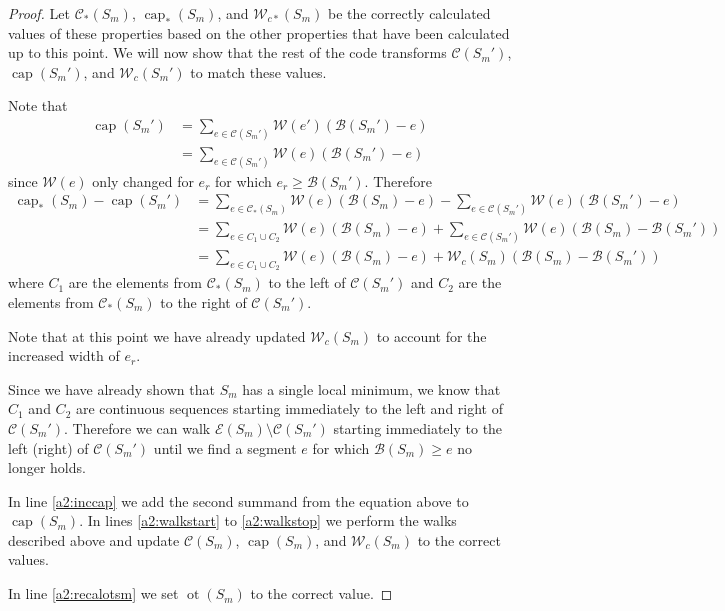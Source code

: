 \documentclass[11pt,a4paper]{article}
\DeclareMathOperator{\capp}{cap}
\DeclareMathOperator{\ot}{ot}
\begin{document}
\begin{proof}
Let $\mathcal{C_*}(S_m)$, $\capp_*(S_m)$, and $\mathcal{W}_{c*}(S_m)$ be the correctly calculated values of these properties based on the other properties that have been calculated up to this point.
We will now show that the rest of the code transforms $\mathcal{C}(S_m')$, $\capp(S_m')$, and $\mathcal{W}_c(S_m')$ to match these values.

Note that
\begin{align*}
    \capp(S_m') &= \sum_{e\in\mathcal{C}(S_m')} \mathcal{W}(e')(\mathcal{B}(S_m')-e) \\
                &= \sum_{e\in\mathcal{C}(S_m')} \mathcal{W}(e)(\mathcal{B}(S_m')-e)
\end{align*}
since $\mathcal{W}(e)$ only changed for $e_r$ for which $e_r\ge\mathcal{B}(S_m')$.
Therefore
\begin{align*}
    \capp_*(S_m) - \capp(S_m') &= \sum_{e\in\mathcal{C_*}(S_m)} \mathcal{W}(e)(\mathcal{B}(S_m)-e) - \sum_{e\in\mathcal{C}(S_m')} \mathcal{W}(e)(\mathcal{B}(S_m')-e) \\
               &= \sum_{e\in C_1\cup C_2}\mathcal{W}(e)(\mathcal{B}(S_m)-e) + \sum_{e\in\mathcal{C}(S_m')} \mathcal{W}(e)(\mathcal{B}(S_m)-\mathcal{B}(S_m')) \\
               &= \sum_{e\in C_1\cup C_2}\mathcal{W}(e)(\mathcal{B}(S_m)-e) + \mathcal{W}_c(S_m)(\mathcal{B}(S_m) - \mathcal{B}(S_m'))
\end{align*}
where $C_1$ are the elements from $\mathcal{C_*}(S_m)$ to the left of $\mathcal{C}(S_m')$ and $C_2$ are the elements from $\mathcal{C_*}(S_m)$ to the right of $\mathcal{C}(S_m')$.

Note that at this point we have already updated $\mathcal{W}_c(S_m)$ to account for the increased width of $e_r$.

Since we have already shown that $S_m$ has a single local minimum, we know that $C_1$ and $C_2$ are continuous sequences starting immediately to the left and right of $\mathcal{C}(S_m')$.
Therefore we can walk $\mathcal{E}(S_m)\setminus\mathcal{C}(S_m')$ starting immediately to the left (right) of $\mathcal{C}(S_m')$ until we find a segment $e$ for which $\mathcal{B}(S_m)\ge e$ no longer holds.

In line \ref{a2:inccap} we add the second summand from the equation above to $\capp(S_m)$.
In lines \ref{a2:walkstart} to \ref{a2:walkstop} we perform the walks described above and update $\mathcal{C}(S_m)$, $\capp(S_m)$, and $\mathcal{W}_c(S_m)$ to the correct values.

In line \ref{a2:recalotsm} we set $\ot(S_m)$ to the correct value.


\end{proof}
\end{document}

